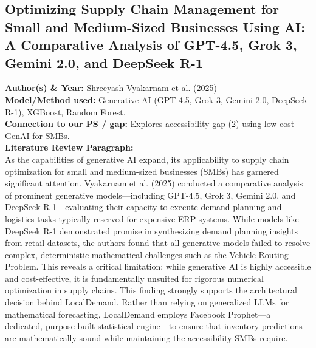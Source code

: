 \documentclass[conference]{IEEEtran}
\begin{document}
\subsection{Optimizing Supply Chain Management for Small and Medium-Sized Businesses Using AI: A Comparative Analysis of GPT-4.5, Grok 3, Gemini 2.0, and DeepSeek R-1}
\textbf{Author(s) \& Year:} Shreeyash Vyakarnam et al. (2025)\\
\textbf{Model/Method used:} Generative AI (GPT-4.5, Grok 3, Gemini 2.0, DeepSeek R-1), XGBoost, Random Forest.\\
\textbf{Connection to our PS / gap:} Explores accessibility gap (2) using low-cost GenAI for SMBs.\\
\textbf{Literature Review Paragraph:}\\
As the capabilities of generative AI expand, its applicability to supply chain optimization for small and medium-sized businesses (SMBs) has garnered significant attention. Vyakarnam et al. (2025) conducted a comparative analysis of prominent generative models---including GPT-4.5, Grok 3, Gemini 2.0, and DeepSeek R-1---evaluating their capacity to execute demand planning and logistics tasks typically reserved for expensive ERP systems. While models like DeepSeek R-1 demonstrated promise in synthesizing demand planning insights from retail datasets, the authors found that all generative models failed to resolve complex, deterministic mathematical challenges such as the Vehicle Routing Problem. This reveals a critical limitation: while generative AI is highly accessible and cost-effective, it is fundamentally unsuited for rigorous numerical optimization in supply chains. This finding strongly supports the architectural decision behind LocalDemand. Rather than relying on generalized LLMs for mathematical forecasting, LocalDemand employs Facebook Prophet---a dedicated, purpose-built statistical engine---to ensure that inventory predictions are mathematically sound while maintaining the accessibility SMBs require.
\end{document}
